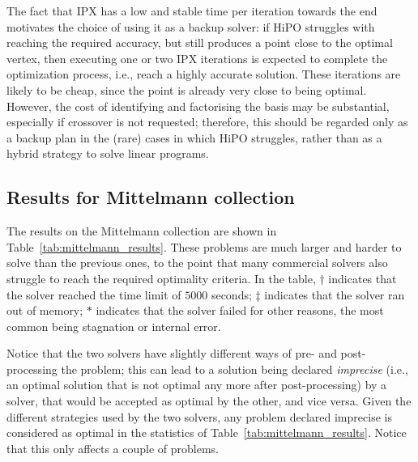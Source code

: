 \documentclass[a4paper]{article}
\newcommand{\0}{\mathbf 0}
\begin{document}
The fact that IPX has a low and stable time per iteration towards the end motivates the choice of using it as a backup solver: if HiPO struggles with reaching the required accuracy, but still produces a point close to the optimal vertex, then executing one or two IPX iterations is expected to complete the optimization process, i.e., reach a highly accurate solution. These iterations are likely to be cheap, since the point is already very close to being optimal. However, the cost of identifying and factorising the basis may be substantial, especially if crossover is not requested; therefore, this should be regarded only as a backup plan in the (rare) cases in which HiPO struggles, rather than as a hybrid strategy to solve linear programs.





\subsection{Results for Mittelmann collection}
The results on the Mittelmann collection are shown in Table~\ref{tab:mittelmann_results}. These problems are much larger and harder to solve than the previous ones, to the point that many commercial solvers also struggle to reach the required optimality criteria. In the table, $\dagger$ indicates that the solver reached the time limit of $5000$ seconds; $\ddagger$ indicates that the solver ran out of memory; $\ast$ indicates that the solver failed for other reasons, the most common being stagnation or internal error.

Notice that the two solvers have slightly different ways of pre- and post-processing the problem; this can lead to a solution being declared {\it imprecise} (i.e., an optimal solution that is not optimal any more after post-processing) by a solver, that would be accepted as optimal by the other, and vice versa. Given the different strategies used by the two solvers, any problem declared imprecise is considered as optimal in the statistics of Table~\ref{tab:mittelmann_results}. Notice that this only affects a couple of problems.
\end{document}
